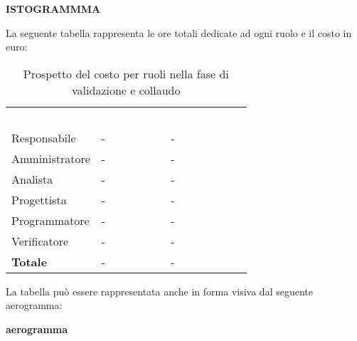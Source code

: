 \textbf{ISTOGRAMMMA}


La seguente tabella rappresenta le ore totali dedicate ad ogni ruolo e il costo in euro:

\begin{table}[!htbp]
\begin{center}
\renewcommand{\arraystretch}{1.5}
\begin{tabular}{ m{}<{\centering}  m{}<{\centering} m{}<{\centering}}
	\rowcolor{darkblue}
	\textcolor{white}{\textbf{Ruolo}}&\textcolor{white}{\textbf{Totale ore}}&\textcolor{white}{\textbf{Costo totale}}\\ 

	Responsabile  & - & - \\	

	Amministratore & - & - \\
	
	Analista & - & - \\
	
	Progettista & - & - \\
	
	Programmatore & - & - \\
	
	Verificatore & - & - \\
	
	\textbf{Totale} & - & - \\
	
\end{tabular}
\caption{Prospetto del costo per ruoli nella fase di validazione e collaudo}
\end{center}
\end{table}

La tabella può essere rappresentata anche in forma visiva dal seguente aerogramma:

\textbf{aerogramma}









